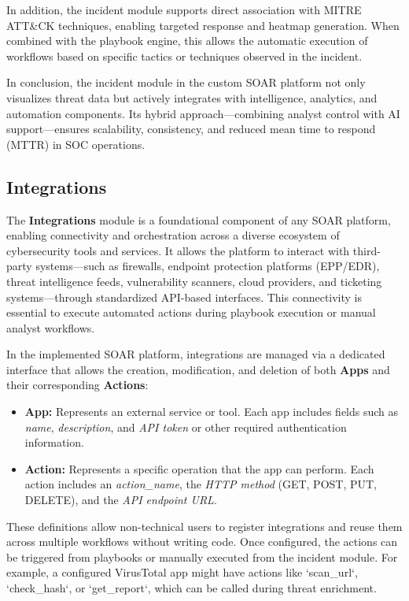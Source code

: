 In addition, the incident module supports direct association with MITRE ATT\&CK techniques, enabling targeted response and heatmap generation. When combined with the playbook engine, this allows the automatic execution of workflows based on specific tactics or techniques observed in the incident.

In conclusion, the incident module in the custom SOAR platform not only visualizes threat data but actively integrates with intelligence, analytics, and automation components. Its hybrid approach—combining analyst control with AI support—ensures scalability, consistency, and reduced mean time to respond (MTTR) in SOC operations.

\subsection{Integrations}

The \textbf{Integrations} module is a foundational component of any SOAR platform, enabling connectivity and orchestration across a diverse ecosystem of cybersecurity tools and services. It allows the platform to interact with third-party systems—such as firewalls, endpoint protection platforms (EPP/EDR), threat intelligence feeds, vulnerability scanners, cloud providers, and ticketing systems—through standardized API-based interfaces. This connectivity is essential to execute automated actions during playbook execution or manual analyst workflows.

In the implemented SOAR platform, integrations are managed via a dedicated interface that allows the creation, modification, and deletion of both \textbf{Apps} and their corresponding \textbf{Actions}:

\begin{itemize}
    \item \textbf{App:} Represents an external service or tool. Each app includes fields such as \textit{name}, \textit{description}, and \textit{API token} or other required authentication information.
    \item \textbf{Action:} Represents a specific operation that the app can perform. Each action includes an \textit{action\_name}, the \textit{HTTP method} (GET, POST, PUT, DELETE), and the \textit{API endpoint URL}.
\end{itemize}

These definitions allow non-technical users to register integrations and reuse them across multiple workflows without writing code. Once configured, the actions can be triggered from playbooks or manually executed from the incident module. For example, a configured VirusTotal app might have actions like `scan\_url`, `check\_hash`, or `get\_report`, which can be called during threat enrichment.

